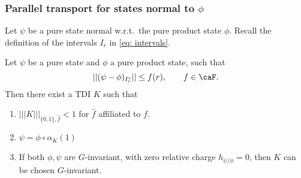 \subsubsection{Parallel transport for states normal to $\phi$}
Let $\psi$ be a pure state normal w.r.t.\ the pure product state $\phi$.
Recall the definition of the intervals $I_r$ in \eqref{eq: intervals}. 
\begin{lemma}\label{lem: parallel transport}
	Let $\psi$ be a  pure state and $\phi$ a pure product state, such that
	\begin{equation}\label{eq: one-sided bounds repeat}
		|| (\psi-\phi)_{I_r^c} || \leq f(r),\qquad f \in \caF.
	\end{equation}
	Then there exist a  TDI $K$ such that 
	\begin{enumerate}
		\item   $|||K|||_{\{0,1\},\hat{f}} <1$ for $\hat{f}$ affiliated to $f$.  
		\item $\psi = \phi\circ \alpha_K(1)$
		\item  If both $\phi,\psi$ are $G$-invariant, with zero relative charge $h_{\psi/\phi}=0$, then $K$ can be chosen $G$-invariant.
	\end{enumerate}
\end{lemma}
